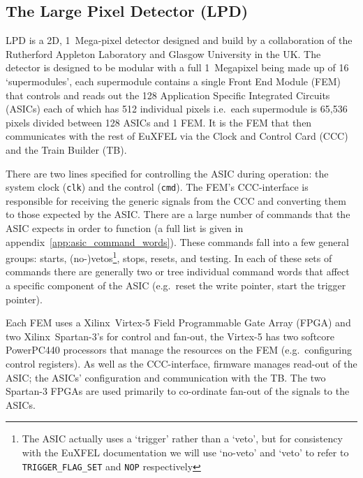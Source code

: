 \subsection{The Large Pixel Detector (LPD)} %
\label{sub:the_large_pixel_detector_lpd}
LPD is a 2D, 1~Mega-pixel detector designed and build by a collaboration of the Rutherford Appleton Laboratory and Glasgow University in the UK. The detector is designed to be modular with a full 1~Megapixel being made up of 16 `supermodules', each supermodule contains a single Front End Module (FEM) that controls and reads out the 128 Application Specific Integrated Circuits (ASICs) each of which has 512 individual pixels i.e.\ each supermodule is 65,536 pixels divided between 128 ASICs and 1 FEM. It is the FEM that then communicates with the rest of EuXFEL via the Clock and Control Card (CCC) and the Train Builder (TB).
    
There are two lines specified for controlling the ASIC during operation: the system clock (\texttt{clk}) and the control (\texttt{cmd}). The FEM's CCC-interface is responsible for receiving the generic signals from the CCC and converting them to those expected by the ASIC. There are a large number of commands that the ASIC expects in order to function (a full list is given in appendix~\ref{app:asic_command_words}). These commands fall into a few general groups: starts, (no-)vetos\footnote{The ASIC actually uses a `trigger' rather than a `veto', but for consistency with the EuXFEL documentation we will use `no-veto' and `veto' to refer to \texttt{TRIGGER\_FLAG\_SET} and \texttt{NOP} respectively}, stops, resets, and testing. In each of these sets of commands there are generally two or tree individual command words that affect a specific component of the ASIC (e.g.\ reset the write pointer, start the trigger pointer). 
    
Each FEM uses a Xilinx~Virtex-5 Field Programmable Gate Array (FPGA) and two Xilinx~Spartan-3's for control and fan-out, the Virtex-5 has two softcore PowerPC440 processors that manage the resources on the FEM (e.g.\ configuring control registers). As well as the CCC-interface, firmware manages read-out of the ASIC; the ASICs' configuration and communication with the TB. The two Spartan-3 FPGAs are used primarily to co-ordinate fan-out of the signals to the ASICs.
